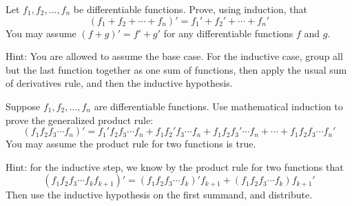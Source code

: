 \begin{questions}
	
\question Let $f_1, f_2,\ldots, f_n$ be differentiable functions.  Prove, using induction, that
\[(f_1 + f_2 + \cdots + f_n)' = f_1' + f_2' + \cdots + f_n'\]
You may assume $(f+g)' = f' + g'$ for any differentiable functions $f$ and $g$.

	\begin{answer}
		Hint: You are allowed to assume the base case.  For the inductive case, group all but the last function together as one sum of functions, then apply the usual sum of derivatives rule, and then the inductive hypothesis.
	\end{answer}


\question Suppose $f_1, f_2, \ldots, f_n$ are differentiable functions.  Use mathematical induction to prove the generalized product rule: 
\[(f_1 f_2 f_3 \cdots f_n)' = f_1' f_2 f_3 \cdots f_n + f_1 f_2' f_3 \cdots f_n + f_1 f_2 f_3' \cdots f_n + \cdots + f_1 f_2 f_3 \cdots f_n'\]
You may assume the product rule for two functions is true.

	\begin{answer}
		Hint: for the inductive step, we know by the product rule for two functions that \[(f_1f_2f_3 \cdots f_k f_{k+1})' = (f_1f_2f_3\cdots f_k)'f_{k+1} + (f_1f_2f_3\cdots f_k)f_{k+1}'\]
		Then use the inductive hypothesis on the first summand, and distribute.
	\end{answer}


\end{questions}